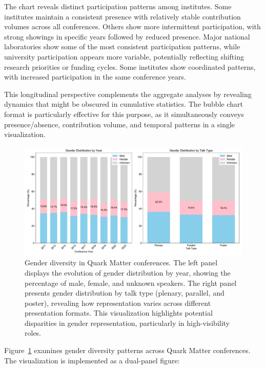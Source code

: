 \documentclass[a4paper,11pt]{article}
\begin{document}
The chart reveals distinct participation patterns among institutes. Some institutes maintain a consistent presence with relatively stable contribution volumes across all conferences. Others show more intermittent participation, with strong showings in specific years followed by reduced presence. Major national laboratories show some of the most consistent participation patterns, while university participation appears more variable, potentially reflecting shifting research priorities or funding cycles. Some institutes show coordinated patterns, with increased participation in the same conference years.

This longitudinal perspective complements the aggregate analyses by revealing dynamics that might be obscured in cumulative statistics. The bubble chart format is particularly effective for this purpose, as it simultaneously conveys presence/absence, contribution volume, and temporal patterns in a single visualization.

\begin{figure}[H]
\centering
\includegraphics[width=\textwidth]{figures/gender_diversity.pdf}
\caption{Gender diversity in Quark Matter conferences. The left panel displays the evolution of gender distribution by year, showing the percentage of male, female, and unknown speakers. The right panel presents gender distribution by talk type (plenary, parallel, and poster), revealing how representation varies across different presentation formats. This visualization highlights potential disparities in gender representation, particularly in high-visibility roles.}
\label{fig:gender_diversity}
\end{figure}

Figure~\ref{fig:gender_diversity} examines gender diversity patterns across Quark Matter conferences. The visualization is implemented as a dual-panel figure:
\end{document}
